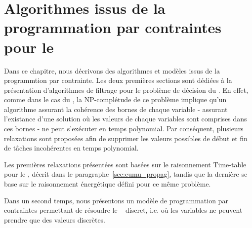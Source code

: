 \chapter{Algorithmes issus de la programmation par contraintes pour le
\CECSP}
\label{sec:PPC_CECSP}
Dans ce chapitre, nous décrivons des algorithmes et modèles issus de
la programmtion par contrainte. Les deux premières sections sont
dédiées à la présentation d'algorithmes de filtrage pour le problème
de décision du \CECSP. En effet, comme dans le cas du \CUSP, la
NP-complétude de ce problème implique qu'un algorithme assurant la
cohérence des bornes de chaque variable - assurant l'existance d'une
solution où les valeurs de chaque variables sont comprises dans ces
bornes - ne peut s'exécuter en temps polynomial. Par conséquent,
plusieurs relaxations sont proposées afin de supprimer les valeurs
possibles de début et fin de tâches
incohérentes en temps polynomial. 

Les premières relaxations présentées sont basées sur le raisonnement
Time-table pour le \CUSP, décrit dans le
paragraphe~\ref{sec:cumu_propag}, tandis que la dernière se base sur
le raisonnement énergétique défini pour ce même problème.

Dans un second temps, nous présentons un modèle de programmation par
contraintes permettant de résoudre le \CECSP~ discret, i.e. où les
variables ne peuvent prendre que des valeurs discrètes. 





